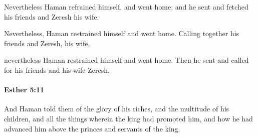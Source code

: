 			\begin{versebox}
					\item[BHS] 
					\item[LXX] 
					\item[ASV] Nevertheless Haman refrained himself, and went home; and he sent and fetched his friends and Zeresh his wife.
					\item[NIV] Nevertheless, Haman restrained himself and went home. Calling together his friends and Zeresh, his wife,
					\item[NRSV] nevertheless Haman restrained himself and went home. Then he sent and called for his friends and his wife Zeresh,
			\end{versebox}

		\paragraph{Esther 5:11} %
			\label{ESTHER-5-11}

			And Haman told them of the glory of his riches, and the multitude of his children, and all the things wherein the king had promoted him, and how he had advanced him above the princes and servants of the king.

